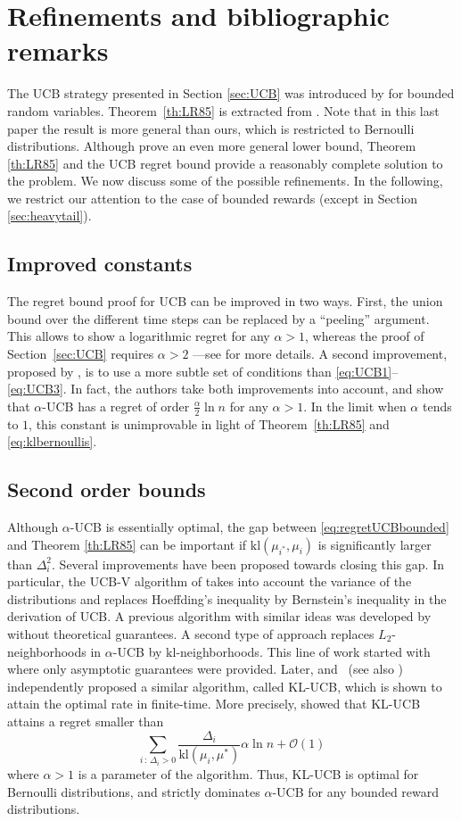 \documentclass[11pt]{hackednow}
\newcommand{\kl}{\mathrm{kl}}
\begin{document}
\section{Refinements and bibliographic remarks}
The UCB strategy presented in Section \ref{sec:UCB} was introduced by \cite{ACF02} for bounded random variables. Theorem~\ref{th:LR85} is extracted from \cite{LR85}. Note that in this last paper the result is more general than ours, which is restricted to Bernoulli distributions. Although \cite{BK97} prove an even more general lower bound, Theorem \ref{th:LR85} and the UCB regret bound provide a reasonably complete solution to the problem. We now discuss some of the possible refinements. In the following, we restrict our attention to the case of bounded rewards (except in Section \ref{sec:heavytail}).

\subsection{Improved constants}
The regret bound proof for UCB can be improved in two ways. First, the union bound over the different time steps can be replaced by a ``peeling'' argument. This allows to show a logarithmic regret for any $\alpha > 1$, whereas the proof of Section~\ref{sec:UCB} requires $\alpha > 2$ ---see \cite[Section 2.2]{Bub10} for more details. A second improvement, proposed by \cite{GC11}, is to use a more subtle set of conditions than \eqref{eq:UCB1}--\eqref{eq:UCB3}. In fact, the authors take both improvements into account, and show that $\alpha$-UCB has a regret of order $\frac{\alpha}{2} \ln n$ for any $\alpha > 1$. In the limit when $\alpha$ tends to $1$, this constant is unimprovable in light of Theorem~\ref{th:LR85} and \eqref{eq:klbernoullis}.

\subsection{Second order bounds}
Although $\alpha$-UCB is essentially optimal, the gap between \eqref{eq:regretUCBbounded} and Theorem \ref{th:LR85} can be important if $\kl(\mu_{i^*}, \mu_i)$ is significantly larger than $\Delta_i^2$. Several improvements have been proposed towards closing this gap. In particular, the UCB-V algorithm of \cite{AMS09} takes into account the variance of the distributions and replaces Hoeffding's inequality by Bernstein's inequality in the derivation of UCB. A previous algorithm with similar ideas was developed by \cite{ACF02} without theoretical guarantees. A second type of approach replaces $L_2$-neighborhoods in $\alpha$-UCB by $\kl$-neighborhoods. This line of work started with \cite{HT10} where only asymptotic guarantees were provided. Later, \cite{GC11} and~\cite{MMS11} (see also \cite{CGMMS12}) independently proposed a similar algorithm, called KL-UCB, which is shown to attain the optimal rate in finite-time. More precisely, \cite{GC11} showed that KL-UCB attains a regret smaller than
\[
    \sum_{i \,:\, \Delta_i > 0} \frac{\Delta_i}{\kl(\mu_i,\mu^*)} \alpha \ln n + \mathcal{O}(1)
\]
where $\alpha >1$ is a parameter of the algorithm. Thus, KL-UCB is optimal for Bernoulli distributions, and strictly dominates $\alpha$-UCB for any bounded reward distributions.
\end{document}
